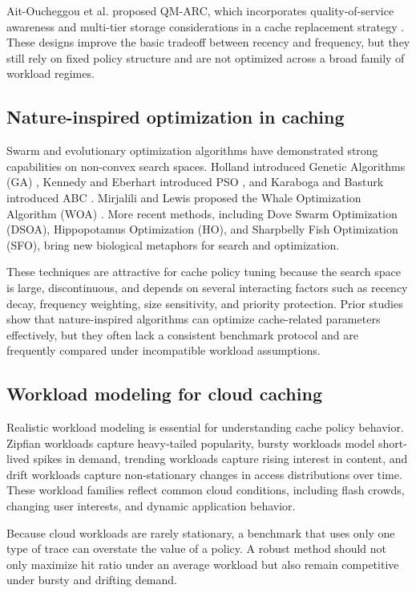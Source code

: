 \documentclass[10pt,journal,compsoc]{IEEEtran}
\begin{document}
Ait-Oucheggou et al. proposed QM-ARC, which incorporates quality-of-service awareness and multi-tier storage considerations in a cache replacement strategy \cite{ait2025qmarc}. These designs improve the basic tradeoff between recency and frequency, but they still rely on fixed policy structure and are not optimized across a broad family of workload regimes.

\subsection{Nature-inspired optimization in caching}
Swarm and evolutionary optimization algorithms have demonstrated strong capabilities on non-convex search spaces. Holland introduced Genetic Algorithms (GA) \cite{holland1992adaptation}, Kennedy and Eberhart introduced PSO \cite{kennedy1995pso}, and Karaboga and Basturk introduced ABC \cite{karaboga2007abc}. Mirjalili and Lewis proposed the Whale Optimization Algorithm (WOA) \cite{mirjalili2016woa}. More recent methods, including Dove Swarm Optimization (DSOA), Hippopotamus Optimization (HO), and Sharpbelly Fish Optimization (SFO), bring new biological metaphors for search and optimization.

These techniques are attractive for cache policy tuning because the search space is large, discontinuous, and depends on several interacting factors such as recency decay, frequency weighting, size sensitivity, and priority protection. Prior studies show that nature-inspired algorithms can optimize cache-related parameters effectively, but they often lack a consistent benchmark protocol and are frequently compared under incompatible workload assumptions.

\subsection{Workload modeling for cloud caching}
Realistic workload modeling is essential for understanding cache policy behavior. Zipfian workloads capture heavy-tailed popularity, bursty workloads model short-lived spikes in demand, trending workloads capture rising interest in content, and drift workloads capture non-stationary changes in access distributions over time. These workload families reflect common cloud conditions, including flash crowds, changing user interests, and dynamic application behavior.

Because cloud workloads are rarely stationary, a benchmark that uses only one type of trace can overstate the value of a policy. A robust method should not only maximize hit ratio under an average workload but also remain competitive under bursty and drifting demand.
\end{document}
